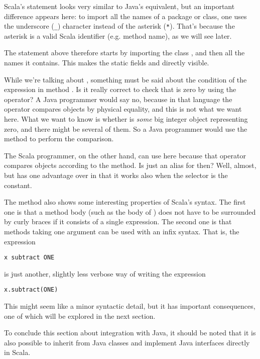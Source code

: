 \documentclass[a4paper,12pt,twoside,titlepage]{article}
\newcommand{\langname}[1]{#1\xspace}
\newcommand{\Scala}{\langname{Scala}}
\newcommand{\Java}{\langname{Java}}
\begin{document}
\Scala's  statement looks very similar to \Java's
equivalent, but an important difference appears here: to import all
the names of a package or class, one uses the underscore (\verb|_|)
character instead of the asterisk (\verb|*|). That's because the
asterisk is a valid \Scala identifier (e.g. method name), as we will
see later.

The  statement above therefore starts by importing the
class , and then all the names it
contains. This makes the static fields  and 
directly visible.

While we're talking about , something must be said about
the condition of the  expression in method . Is
it really correct to check that  is zero by using the
\code{==} operator? A \Java programmer would say no, because in that
language the \code{==} operator compares objects by physical
equality, and this is not what we want here. What we want to know is
whether  is \emph{some} big integer object representing zero,
and there might be several of them. So a \Java programmer would use
the  method to perform the comparison.

The \Scala programmer, on the other hand, can use \code{==} here
because that operator compares objects according to the 
method. Is \code{==} just an alias for  then? Well,
almost, but \code{==} has one advantage over  in that it
works also when the selector is the  constant.

The  method also shows some interesting properties of
\Scala's syntax. The first one is that a method body (such as the body
of ) does not have to be surrounded by curly braces if it
consists of a single expression.  The second one is that methods
taking one argument can be used with an infix syntax. That is, the
expression
\begin{lstlisting}
x subtract ONE
\end{lstlisting}
is just another, slightly less verbose way of writing the expression
\begin{lstlisting}
x.subtract(ONE)
\end{lstlisting}
This might seem like a minor syntactic detail, but it has important
consequences, one of which will be explored in the next section.

To conclude this section about integration with \Java, it should be
noted that it is also possible to inherit from \Java classes and
implement \Java interfaces directly in \Scala.
\end{document}
